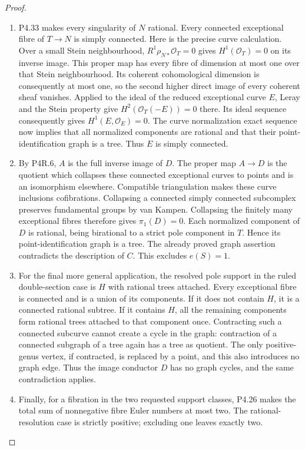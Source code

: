 \begin{proof}
\begin{enumerate}[label={$\langle1\rangle$\arabic*.},leftmargin=*]
\item P4.33 makes every singularity of $N$ rational.
Every connected exceptional fibre of $T\to N$
is simply connected. Here is the precise curve
calculation. Over a small Stein neighbourhood,
$R^1\rho_{N*}\mathcal O_T=0$ gives
$H^1(\mathcal O_T)=0$ on its inverse image.
This proper map has every fibre of dimension at
most one over that Stein neighbourhood. Its coherent
cohomological dimension is consequently at most
one, so the second higher direct image of every
coherent sheaf vanishes. Applied to the ideal of the reduced
exceptional curve $E$, Leray and the Stein property
give $H^2(\mathcal O_T(-E))=0$ there. Its ideal
sequence consequently gives $H^1(E,\mathcal O_E)=0$.
The curve normalization exact sequence now implies
that all normalized components are rational and
that their point-identification graph is a tree.
Thus $E$ is simply connected.

\item By P4R.6, $A$ is the full inverse image of $D$.
The proper map $A\to D$ is the quotient which
collapses these connected exceptional curves to
points and is an isomorphism elsewhere.
Compatible triangulation makes these curve
inclusions cofibrations. Collapsing a connected
simply connected subcomplex preserves fundamental
groups by van Kampen. Collapsing the finitely many
exceptional fibres therefore gives $\pi_1(D)=0$.
Each normalized component of $D$ is rational,
being birational to a strict pole component in
$T$. Hence its point-identification graph is a
tree. The already proved graph assertion contradicts
the description of $C$. This excludes $e(S)=1$.

\item For the final more general application, the
resolved pole support in the ruled double-section
case is $H$ with rational trees attached.
Every exceptional fibre is connected and is a
union of its components. If it does not contain
$H$, it is a connected rational subtree. If it
contains $H$, all the remaining components form
rational trees attached to that component once.
Contracting such a connected subcurve cannot
create a cycle in the graph: contraction of a
connected subgraph of a tree again has a tree
as quotient. The only positive-genus vertex,
if contracted, is replaced by a point, and this
also introduces no graph edge. Thus the image
conductor $D$ has no graph cycles, and the same
contradiction applies.

\item Finally, for a fibration in the two requested
support classes, P4.26 makes the total sum of
nonnegative fibre Euler numbers at most two.
The rational-resolution case is strictly positive;
excluding one leaves exactly two.

\end{enumerate}
\end{proof}
